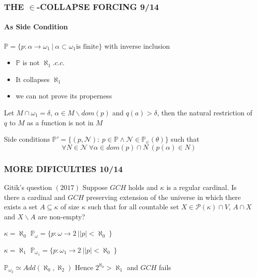 \documentclass{beamer}
\begin{document}
\begin{frame}
\frametitle{THE $\in$-COLLAPSE FORCING \hspace{41mm}9/14}
\framesubtitle{As Side Condition}
$\mathbb{P}=\{p:\alpha \longrightarrow \omega_1 \ | \ \alpha \subset \omega_1 \text{is finite} \}$ with inverse inclusion
\begin{itemize}
\item $\mathbb{P}$ is not $\aleph_1.c.c.$
\item It collapses $\aleph_1$
\item we can not prove its properness
\end{itemize}
\begin{block}{}
Let $M \cap \omega_1 = \delta$, $\alpha \in M \backslash dom(p)$ and $q(a) > \delta$, then the natural restriction of $q$ to $M$ as a function is not in $M$
\end{block}
\pause
\begin{block}{Side conditions}
$\mathbb{P}'=\{(p, \mathcal{N}) : \ p \in \mathbb{P} \land \mathcal{N} \in \mathbb{P}_{\in}(\theta)\}$ such that
$$ \forall N \in \mathcal{N} \ \forall \alpha \in dom(p) \cap N \ (p(\alpha) \in N)$$
\end{block}
\end{frame}
\begin{frame}
\frametitle{MORE DIFICULTIES \hspace{59mm}10/14}
\begin{block}{Gitik's question $(2017)$}
Suppose $GCH$ holds and $\kappa$ is a regular cardinal. Is there a cardinal and $GCH$ preserving extension of the universe in which there exists a set $A \subseteq \kappa$ of size $\kappa$ such that for all countable set $X \in \mathscr{P}(\kappa) \cap V$, $A \cap X$ and $X\backslash A$ are non-empty?
\end{block}
\pause
\begin{block}{$\kappa= \aleph_0$}
$\mathbb{P}_{\omega} = \{p:\omega \longrightarrow 2 \ | |p| < \aleph_0 \ \}$
\end{block}
\begin{block}{$\kappa= \aleph_1$}
$\mathbb{P}_{\omega_1} = \{p:\omega_1 \longrightarrow 2 \ | |p| < \aleph_0 \ \}$
\end{block}
$\mathbb{P}_{\omega_2} \simeq Add(\aleph_0, \aleph_2)$ Hence $2^{\aleph_0}> \aleph_1$ and $GCH$ fails
\end{frame}
\end{document}
